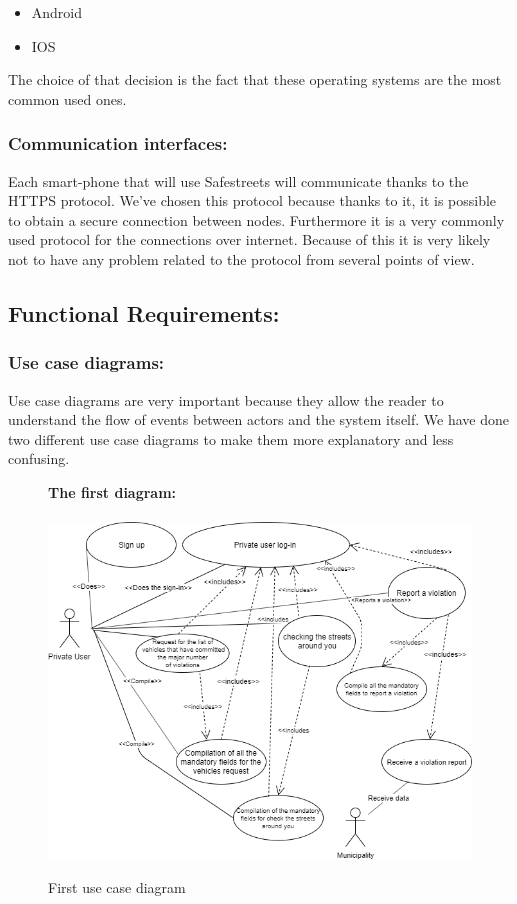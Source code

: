 \documentclass[titlepage]{article}
\begin{document}
\begin{itemize}
	\item Android 
	\item IOS
\end{itemize}	
The choice of that decision is the fact that these operating systems are the most common used ones.
	
\subsubsection{Communication interfaces: }
Each smart-phone that will use Safestreets will communicate thanks to the HTTPS protocol. We've chosen this protocol because thanks to it, it is possible to obtain a secure connection between nodes. Furthermore it is a very commonly used protocol for the connections over internet. Because of this it is very likely not to have any problem related to the protocol from several points of view.
\subsection{Functional Requirements:}
\subsubsection{Use case diagrams: }
Use case diagrams are very important because they allow the reader to understand the flow of events between actors and the system itself. We have done two different use case diagrams to make them more explanatory and less confusing.

\begin{figure}[h]
	\textbf{The first diagram:\\ \\}
	\includegraphics[scale=0.465]{use case diagrams/use case diagrams.png}
	\centering
	\caption{First use case diagram}
\end{figure}
\FloatBarrier
\end{document}
